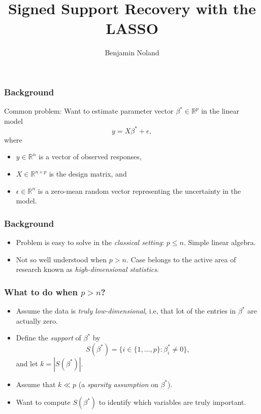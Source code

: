 \documentclass{beamer}
\title{Signed Support Recovery with the LASSO}
\author{Benjamin Noland}
\date{}
\begin{document}
\frame{\titlepage}

\begin{frame}
\frametitle{Background}

Common problem: Want to estimate parameter vector
$\beta^\ast \in \mathbb{R}^p$ in the linear model
\begin{equation*}
  y = X\beta^\ast + \epsilon,
\end{equation*}
where
\begin{itemize}
\item $y \in \mathbb{R}^n$ is a vector of observed responses,
\item $X \in \mathbb{R}^{n \times p}$ is the design matrix, and
\item $\epsilon \in \mathbb{R}^n$ is a zero-mean random vector
  representing the uncertainty in the model.
\end{itemize}

\end{frame}

\begin{frame}
\frametitle{Background}

\begin{itemize}
\item Problem is easy to solve in the \textit{classical setting}:
  $p \leq n$. Simple linear algebra.
\item Not so well understood when $p > n$. Case belongs to the active
  area of research known as \textit{high-dimensional statistics}.
\end{itemize}

\end{frame}

\begin{frame}
\frametitle{What to do when $p > n$?}

\begin{itemize}
\item Assume the data is \textit{truly low-dimensional}, i.e, that lot
  of the entries in $\beta^\ast$ are actually zero.
\item Define the \textit{support} of $\beta^\ast$ by
\begin{equation*}
  S(\beta^\ast) = \{i \in \{1, \ldots, p\} : \beta^\ast_i \neq 0\},
\end{equation*}
and let $k = |S(\beta^\ast)|$.
\item Assume that $k \ll p$ (a \textit{sparsity assumption} on
  $\beta^\ast$).
\item Want to compute $S(\beta^\ast)$ to identify which variables are
  truly important.
\end{itemize}

\end{frame}
\end{document}
